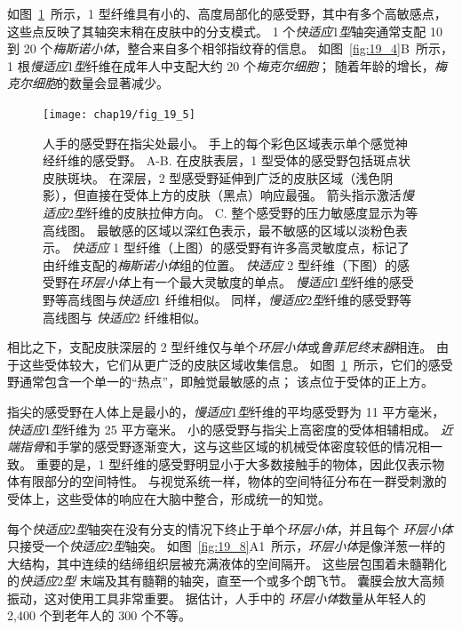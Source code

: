 如图~\ref{fig:19_5}~所示，1 型纤维具有小的、高度局部化的感受野，其中有多个高敏感点，这些点反映了其轴突末稍在皮肤中的分支模式。
1 个\textit{快适应}1\textit{型}轴突通常支配 10 到 20 个\textit{梅斯诺小体}，整合来自多个相邻指纹脊的信息。
如图~\ref{fig:19_4}B~所示，1 根\textit{慢适应}1\textit{型}纤维在成年人中支配大约 20 个\textit{梅克尔细胞}；
随着年龄的增长，\textit{梅克尔细胞}的数量会显著减少。


\begin{figure}[htbp]
	\centering
	\texttt{[image: chap19/fig\_19\_5]}
	\caption{人手的感受野在指尖处最小。
		手上的每个彩色区域表示单个感觉神经纤维的感受野\cite{johansson1983tactile}。
		A-B. 在皮肤表层，1 型受体的感受野包括斑点状皮肤斑块。
		在深层，2 型感受野延伸到广泛的皮肤区域（浅色阴影），但直接在受体上方的皮肤（黑点）响应最强。
		箭头指示激活\textit{慢适应}2\textit{型}纤维的皮肤拉伸方向。
		C. 整个感受野的压力敏感度显示为等高线图。
		最敏感的区域以深红色表示，最不敏感的区域以淡粉色表示。
		\textit{快适应} 1 型纤维（上图）的感受野有许多高灵敏度点，标记了由纤维支配的\textit{梅斯诺小体}组的位置。
		\textit{快适应} 2 型纤维（下图）的感受野在\textit{环层小体}上有一个最大灵敏度的单点。
		\textit{慢适应}1\textit{型}纤维的感受野等高线图与\textit{快适应}1 纤维相似。
		同样，\textit{慢适应}2\textit{型}纤维的感受野等高线图与 \textit{快适应}2 纤维相似。}
	\label{fig:19_5}
\end{figure}


相比之下，支配皮肤深层的 2 型纤维仅与单个\textit{环层小体}或\textit{鲁菲尼终末器}相连。
由于这些受体较大，它们从更广泛的皮肤区域收集信息。 
如图~\ref{fig:19_5}~所示，它们的感受野通常包含一个单一的“热点”，即触觉最敏感的点；
该点位于受体的正上方。


指尖的感受野在人体上是最小的，\textit{慢适应}1\textit{型}纤维的平均感受野为 11 平方毫米，\textit{快适应}1\textit{型}纤维为 25 平方毫米。
小的感受野与指尖上高密度的受体相辅相成。
\textit{近端指骨}和手掌的感受野逐渐变大，这与这些区域的机械受体密度较低的情况相一致。
重要的是，1 型纤维的感受野明显小于大多数接触手的物体，因此仅表示物体有限部分的空间特性。
与视觉系统一样，物体的空间特征分布在一群受刺激的受体上，这些受体的响应在大脑中整合，形成统一的知觉。


每个\textit{快适应}2\textit{型}轴突在没有分支的情况下终止于单个\textit{环层小体}，并且每个 \textit{环层小体}只接受一个\textit{快适应}2\textit{型}轴突。
如图~\ref{fig:19_8}A1~所示，\textit{环层小体}是像洋葱一样的大结构，其中连续的结缔组织层被充满液体的空间隔开。
这些层包围着未髓鞘化的\textit{快适应}2\textit{型} 末端及其有髓鞘的轴突，直至一个或多个朗飞节。
囊膜会放大高频振动，这对使用工具非常重要。
据估计，人手中的 \textit{环层小体}数量从年轻人的 2,400 个到老年人的 300 个不等。



